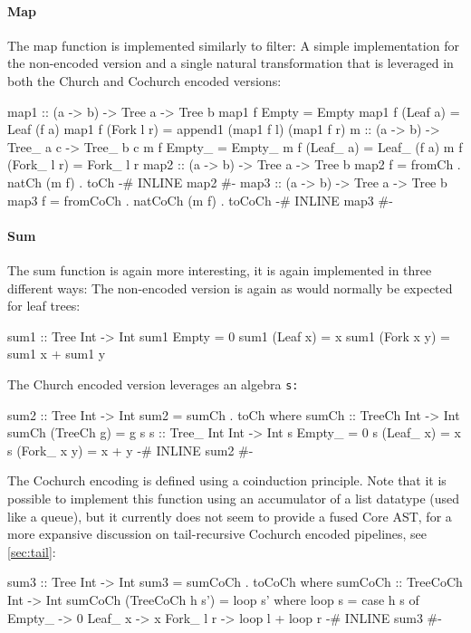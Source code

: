 \paragraph{Map} The map function is implemented similarly to filter: A simple implementation for the non-encoded version and a single natural transformation that is leveraged in both the Church and Cochurch encoded versions:
\begin{code}
map1 :: (a -> b) -> Tree a -> Tree b
map1 f Empty = Empty
map1 f (Leaf a) = Leaf (f a)
map1 f (Fork l r) = append1 (map1 f l) (map1 f r)
m :: (a -> b) -> Tree_ a c -> Tree_ b c
m f Empty_ = Empty_
m f (Leaf_ a) = Leaf_ (f a)
m f (Fork_ l r) = Fork_ l r
map2 :: (a -> b) -> Tree a -> Tree b
map2 f = fromCh . natCh (m f) . toCh
{-# INLINE map2 #-}
map3 :: (a -> b) -> Tree a -> Tree b
map3 f = fromCoCh . natCoCh (m f) . toCoCh
{-# INLINE map3 #-}
\end{code}
\paragraph{Sum} The sum function is again more interesting, it is again implemented in three different ways:
The non-encoded version is again as would normally be expected for leaf trees:
\begin{code}
sum1 :: Tree Int -> Int
sum1 Empty = 0
sum1 (Leaf x) = x
sum1 (Fork x y) = sum1 x + sum1 y
\end{code}
The Church encoded version leverages an algebra \tt{s}:
\begin{code}
sum2 :: Tree Int -> Int
sum2 = sumCh . toCh
  where sumCh :: TreeCh Int -> Int
        sumCh (TreeCh g) = g s
        s :: Tree_ Int Int -> Int
        s Empty_ = 0
        s (Leaf_ x) = x
        s (Fork_ x y) = x + y
{-# INLINE sum2 #-}
\end{code}
The Cochurch encoding is defined using a coinduction principle.
Note that it is possible to implement this function using an accumulator of a list datatype (used like a queue), but it currently does not seem to provide a fused Core AST, for a more expansive discussion on tail-recursive Cochurch encoded pipelines, see \autoref{sec:tail}:
\begin{code}
sum3 :: Tree Int -> Int
sum3 = sumCoCh . toCoCh
  where sumCoCh :: TreeCoCh Int -> Int
        sumCoCh (TreeCoCh h s') = loop s'
          where loop s = case h s of
                  Empty_ -> 0
                  Leaf_ x -> x
                  Fork_ l r -> loop l + loop r
{-# INLINE sum3 #-}
\end{code}
